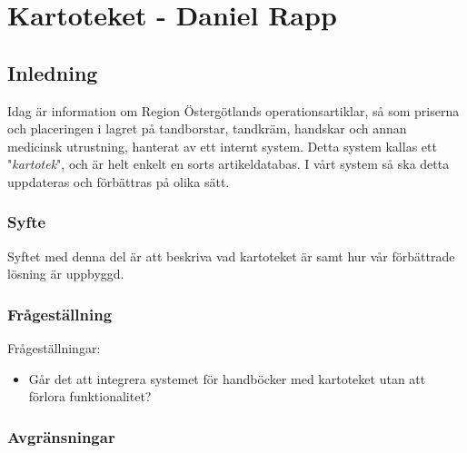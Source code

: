 \section{Kartoteket - Daniel Rapp}
\subsection{Inledning}
Idag är information om Region Östergötlands operationsartiklar, så som priserna och
placeringen i lagret på tandborstar, tandkräm, handskar och annan
medicinsk utrustning, hanterat av ett internt system.
Detta system kallas ett "\textit{kartotek}", och är helt enkelt en sorts artikeldatabas.
I vårt system så ska detta uppdateras och förbättras på olika sätt.

\subsubsection{Syfte}
Syftet med denna del är att beskriva vad kartoteket är samt
hur vår förbättrade lösning är uppbyggd.


\subsubsection{Frågeställning}
Frågeställningar:
\begin{itemize}
  \item Går det att integrera systemet för handböcker med kartoteket utan att förlora funktionalitet?
\end{itemize}


\subsubsection{Avgränsningar}


